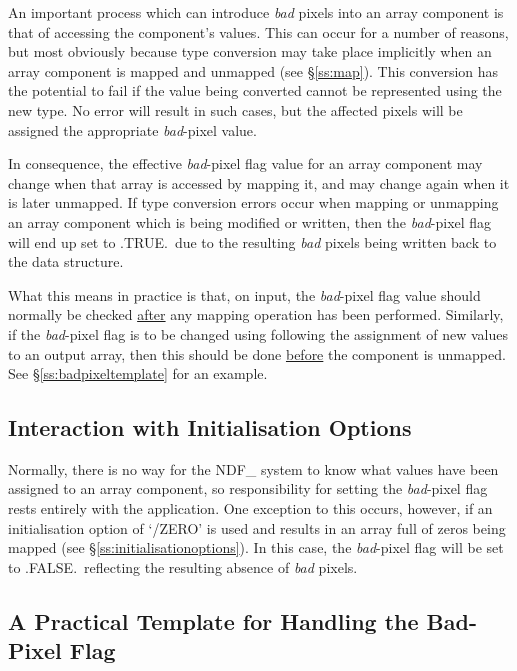 \documentclass[twoside,11pt,nolof]{starlink}
\providecommand{\st}[1]{{\emph{#1}}}
\begin{document}
An important process which can introduce \st{bad\/} pixels into an array
component is that of accessing the component's values.
This can occur for a number of reasons, but most obviously because type
conversion may take place implicitly when an array component is mapped and
unmapped (see \S\ref{ss:map}).
This conversion has the potential to fail if the value being converted
cannot be represented using the new type.
No error will result in such cases, but the affected pixels will be assigned
the appropriate \st{bad\/}-pixel value.

In consequence, the effective \st{bad\/}-pixel flag value for an array
component may change when that array is accessed by mapping it, and may
change again when it is later unmapped.
If type conversion errors occur when mapping or unmapping an array component
which is being modified or written, then the \st{bad\/}-pixel flag will end
up set to .TRUE.\ due to the resulting \st{bad\/} pixels being written back to
the data structure.

What this means in practice is that, on input, the \st{bad\/}-pixel flag
value should normally be checked \underline{after} any mapping operation
has been performed.
Similarly, if the \st{bad\/}-pixel flag is to be changed using 
following the assignment of new values to an output array, then this should
be done \underline{before} the component is unmapped.
See \S\ref{ss:badpixeltemplate} for an example.

\subsection{Interaction with Initialisation Options}

Normally, there is no way for the NDF\_ system to know what values have been
assigned to an array component, so responsibility for setting the
\st{bad\/}-pixel flag rests entirely with the application.
One exception to this occurs, however, if an initialisation option of
`/ZERO' is used and results in an array full of zeros being mapped (see
\S\ref{ss:initialisationoptions}).
In this case, the \st{bad\/}-pixel flag will be set to .FALSE.\ reflecting the
resulting absence of \st{bad\/} pixels.

\subsection{\label{ss:badpixeltemplate}A Practical Template for Handling the Bad-Pixel Flag}
\end{document}
